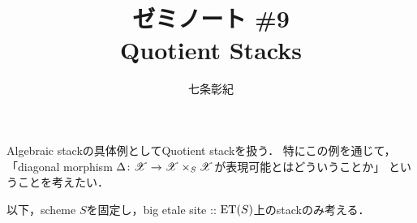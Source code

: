 \documentclass[a4paper, dvipdfmx]{jsarticle}
\newcommand{\Diag}{\Delta}
\begin{document}
\title{ゼミノート \#9 \\ Quotient Stacks}
\author{七条彰紀}
\maketitle
\tableofcontents
\vspace{10pt}

Algebraic stackの具体例としてQuotient stackを扱う．
特にこの例を通じて，
「diagonal morphism $\Diag \colon \fibX \to \fibX \times_S \fibX$が表現可能とはどういうことか」
ということを考えたい．

\begin{Remark}
    以下，scheme $S$を固定し，big etale site :: $\mathrm{ET}(S)$上のstackのみ考える．
\end{Remark}

\begin{Def}
\end{Def}

\begin{Def}
\end{Def}

\begin{Def}[]
\end{Def}
\end{document}
